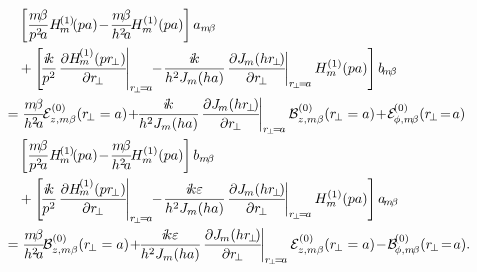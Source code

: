 \begin{align}
&\quad \left[\frac{m\! \beta}{p^2\! a} H\!_m^{(1)}\!(pa) \!-\! \frac{m\! \beta}{h^2\! a}\!H_m^{(1)}(pa) \right] a_{m\!\beta}\nonumber\\
&\quad +\left[\! \frac{i\!k}{p^2}\! \left. \pp{H\!_m^{( 1 )}(p r\!_\perp)}{r\!_\perp}\! \right|_{r\!_\perp\! =\! a}\!\!-\! \frac{i\!k}{h^2J_m(ha)}\! \left. \pp{J\!_m(h r\!_\perp \!)}{r\!_\perp}\! \right|_{r\!_\perp\! =\! a} H_m^{(1)}(pa) \right]b\!_{m\!\beta} \nonumber\\
&= \frac{m\! \beta}{h^2\! a}\! \mathcal{E}_{z,m\beta}^{(0)}(r\!_\perp =a ) \!+\! \! \frac{i\!k}{h^2J_m(ha)}\! \left. \pp{J\!_m(h r\!_\perp \!)}{r\!_\perp}\! \right|_{r\!_\perp\! =\! a}\mathcal{B}_{z,m\beta}^{(0)}(r\!_\perp =a )  \!+\!\mathcal{E}\! _{\phi,m\! \beta}^{(0)}(r\!_\perp\! =\! a )\\
&\quad \left[\frac{m\! \beta}{p^2\! a} H\!_m^{(1)}\!(pa) \!-\! \frac{m\! \beta}{h^2\! a}\!H_m^{(1)}(pa) \right] b_{m\!\beta}\nonumber\\
&\quad +\left[\! \frac{i\!k}{p^2}\! \left. \pp{H\!_m^{( 1 )}(p r\!_\perp)}{r\!_\perp}\! \right|_{r\!_\perp\! =\! a}\!\!-\! \frac{i\!k\varepsilon}{h^2J_m(ha)}\! \left. \pp{J\!_m(h r\!_\perp \!)}{r\!_\perp}\! \right|_{r\!_\perp\! =\! a} H_m^{(1)}(pa) \right]a\!_{m\!\beta} \nonumber\\
&= \frac{m\! \beta}{h^2\! a}\! \mathcal{B}_{z,m\beta}^{(0)}(r\!_\perp =a ) \!+\! \! \frac{i\!k\varepsilon}{h^2J_m(ha)}\! \left. \pp{J\!_m(h r\!_\perp \!)}{r\!_\perp}\! \right|_{r\!_\perp\! =\! a}\mathcal{E}_{z,m\beta}^{(0)}(r\!_\perp =a )  \!-\!\mathcal{B}\! _{\phi,m\! \beta}^{(0)}(r\!_\perp\! =\! a ).
\end{align}


